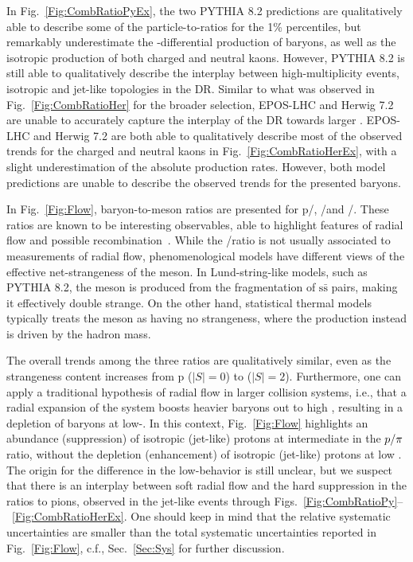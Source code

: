 In Fig.~\ref{Fig:CombRatioPyEx}, the two PYTHIA 8.2 predictions are qualitatively able to describe some of the particle-to-\PI ratios for the 1\% \SOPT percentiles, but remarkably underestimate the \pt-differential production of \XI baryons, as well as the isotropic production of both charged and neutral kaons. However, PYTHIA 8.2 is still able to qualitatively describe the interplay between high-multiplicity events, isotropic and jet-like topologies in the DR. Similar to what was observed in Fig.~\ref{Fig:CombRatioHer} for the broader \SOPT selection, EPOS-LHC and Herwig 7.2 are unable to accurately capture the interplay of the DR towards larger \pt. EPOS-LHC and Herwig 7.2 are both able to qualitatively describe most of the observed trends for the charged and neutral kaons in Fig.~\ref{Fig:CombRatioHerEx}, with a slight underestimation of the absolute production rates. However, both model predictions are unable to describe the observed trends for the presented baryons. 

In Fig.~\ref{Fig:Flow}, baryon-to-meson ratios are presented for p/\PI, \LA/\kzero and \XI/\PHI. These ratios are known to be interesting observables, able to highlight features of radial flow and possible recombination~\cite{ALICE:2019hno}. While the \XI/\PHI ratio is not usually associated to measurements of radial flow, phenomenological models have different views of the effective net-strangeness of the \PHI meson. In Lund-string-like models, such as PYTHIA 8.2, the \PHI meson is produced from the fragmentation of $\textrm{s}\bar{\textrm{s}}$ pairs, making it effectively double strange. On the other hand, statistical thermal models typically treats the \PHI meson as having no strangeness, where the production instead is driven by the hadron mass.

The overall trends among the three ratios are qualitatively similar, even as the strangeness content increases from p ($|S|=0$) to \XI ($|S|=2$). Furthermore, one can apply a traditional hypothesis of radial flow in larger collision systems, i.e., that a radial expansion of the system boosts heavier baryons out to high \pt, resulting in a depletion of baryons at low-\pt. In this context, Fig.~\ref{Fig:Flow} highlights an abundance (suppression) of isotropic (jet-like) protons at intermediate \pt in the $p/\pi$ ratio, without the depletion (enhancement) of isotropic (jet-like) protons at low \pt. The origin for the difference in the low-\pt behavior is still unclear, but we suspect that there is an interplay between soft radial flow and the hard suppression in the ratios to pions, observed in the jet-like events through Figs.~\ref{Fig:CombRatioPy}--~\ref{Fig:CombRatioHerEx}. One should keep in mind that the relative systematic uncertainties are smaller than the total systematic uncertainties reported in Fig.~\ref{Fig:Flow}, c.f., Sec.~\ref{Sec:Sys} for further discussion.


